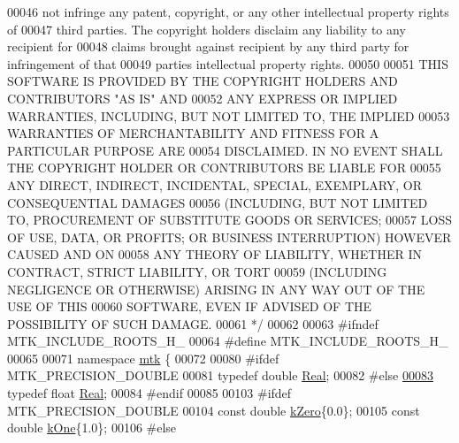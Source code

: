 \begin{DoxyCode}
00046 \textcolor{comment}{not infringe any patent, copyright, or any other intellectual property rights of}
00047 \textcolor{comment}{third parties. The copyright holders disclaim any liability to any recipient for}
00048 \textcolor{comment}{claims brought against recipient by any third party for infringement of that}
00049 \textcolor{comment}{parties intellectual property rights.}
00050 \textcolor{comment}{}
00051 \textcolor{comment}{THIS SOFTWARE IS PROVIDED BY THE COPYRIGHT HOLDERS AND CONTRIBUTORS "AS IS" AND}
00052 \textcolor{comment}{ANY EXPRESS OR IMPLIED WARRANTIES, INCLUDING, BUT NOT LIMITED TO, THE IMPLIED}
00053 \textcolor{comment}{WARRANTIES OF MERCHANTABILITY AND FITNESS FOR A PARTICULAR PURPOSE ARE}
00054 \textcolor{comment}{DISCLAIMED. IN NO EVENT SHALL THE COPYRIGHT HOLDER OR CONTRIBUTORS BE LIABLE FOR}
00055 \textcolor{comment}{ANY DIRECT, INDIRECT, INCIDENTAL, SPECIAL, EXEMPLARY, OR CONSEQUENTIAL DAMAGES}
00056 \textcolor{comment}{(INCLUDING, BUT NOT LIMITED TO, PROCUREMENT OF SUBSTITUTE GOODS OR SERVICES;}
00057 \textcolor{comment}{LOSS OF USE, DATA, OR PROFITS; OR BUSINESS INTERRUPTION) HOWEVER CAUSED AND ON}
00058 \textcolor{comment}{ANY THEORY OF LIABILITY, WHETHER IN CONTRACT, STRICT LIABILITY, OR TORT}
00059 \textcolor{comment}{(INCLUDING NEGLIGENCE OR OTHERWISE) ARISING IN ANY WAY OUT OF THE USE OF THIS}
00060 \textcolor{comment}{SOFTWARE, EVEN IF ADVISED OF THE POSSIBILITY OF SUCH DAMAGE.}
00061 \textcolor{comment}{*/}
00062 
00063 \textcolor{preprocessor}{#ifndef MTK\_INCLUDE\_ROOTS\_H\_}
00064 \textcolor{preprocessor}{#define MTK\_INCLUDE\_ROOTS\_H\_}
00065 
00071 \textcolor{keyword}{namespace }\hyperlink{namespacemtk}{mtk} \{
00072 
00080 \textcolor{preprocessor}{#ifdef MTK\_PRECISION\_DOUBLE}
00081 \textcolor{keyword}{typedef} \textcolor{keywordtype}{double} \hyperlink{group__c01-roots_gac080bbbf5cbb5502c9f00405f894857d}{Real};
00082 \textcolor{preprocessor}{#else}
\hypertarget{mtk__roots_8h_source_l00083}{}\hyperlink{group__c01-roots_gac080bbbf5cbb5502c9f00405f894857d}{00083} \textcolor{keyword}{typedef} \textcolor{keywordtype}{float} \hyperlink{group__c01-roots_gac080bbbf5cbb5502c9f00405f894857d}{Real};
00084 \textcolor{preprocessor}{#endif}
00085 
00103 \textcolor{preprocessor}{#ifdef MTK\_PRECISION\_DOUBLE}
00104 \textcolor{keyword}{const} \textcolor{keywordtype}{double} \hyperlink{group__c01-roots_ga59a451a5fae30d59649bcda274fea271}{kZero}\{0.0\};
00105 \textcolor{keyword}{const} \textcolor{keywordtype}{double} \hyperlink{group__c01-roots_ga26407c24d43b6b95480943340d285c71}{kOne}\{1.0\};
00106 \textcolor{preprocessor}{#else}

\end{DoxyCode}
